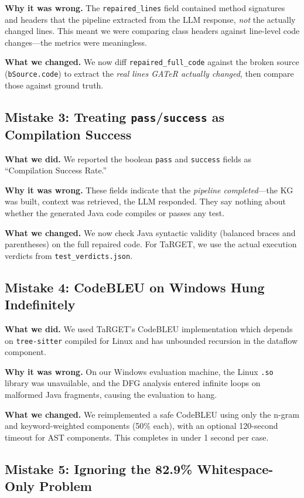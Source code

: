 \documentclass[conference,10pt]{IEEEtran}
\begin{document}
\textbf{Why it was wrong.}  The \texttt{repaired\_lines} field
contained method signatures and headers that the pipeline extracted
from the LLM response, \emph{not} the actually changed lines.  This
meant we were comparing class headers against line-level code
changes---the metrics were meaningless.

\textbf{What we changed.}  We now diff \texttt{repaired\_full\_code}
against the broken source (\texttt{bSource.code}) to extract the
\emph{real lines GATeR actually changed}, then compare those against
ground truth.

\subsection{Mistake 3: Treating \texttt{pass}/\texttt{success} as
Compilation Success}

\textbf{What we did.}  We reported the boolean \texttt{pass} and
\texttt{success} fields as ``Compilation Success Rate.''

\textbf{Why it was wrong.}  These fields indicate that the
\emph{pipeline completed}---the KG was built, context was retrieved,
the LLM responded.  They say nothing about whether the generated Java
code compiles or passes any test.

\textbf{What we changed.}  We now check Java syntactic validity
(balanced braces and parentheses) on the full repaired code.
For TaRGET, we use the actual execution verdicts from
\texttt{test\_verdicts.json}.

\subsection{Mistake 4: CodeBLEU on Windows Hung Indefinitely}

\textbf{What we did.}  We used TaRGET's CodeBLEU implementation which
depends on \texttt{tree-sitter} compiled for Linux and has unbounded
recursion in the dataflow component.

\textbf{Why it was wrong.}  On our Windows evaluation machine, the
Linux \texttt{.so} library was unavailable, and the DFG analysis
entered infinite loops on malformed Java fragments, causing the
evaluation to hang.

\textbf{What we changed.}  We reimplemented a safe CodeBLEU using only
the n-gram and keyword-weighted components (50\% each),
with an optional 120-second timeout for AST components.  This
completes in under 1 second per case.

\subsection{Mistake 5: Ignoring the 82.9\% Whitespace-Only Problem}
\end{document}
